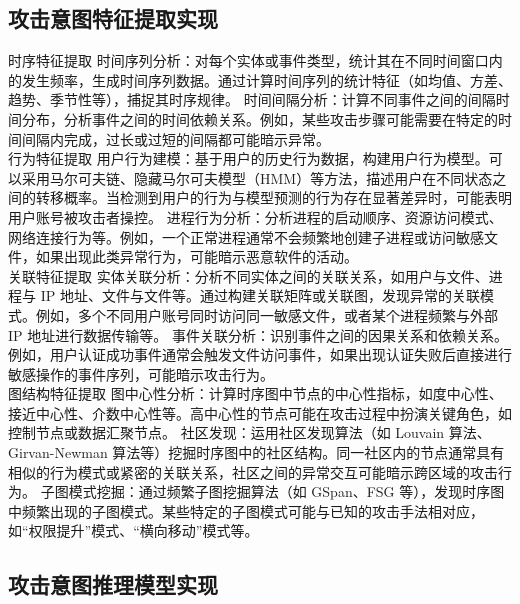 \documentclass{article} %
\begin{document}
	\subsection{攻击意图特征提取实现}

	时序特征提取
	时间序列分析：对每个实体或事件类型，统计其在不同时间窗口内的发生频率，生成时间序列数据。通过计算时间序列的统计特征（如均值、方差、趋势、季节性等），捕捉其时序规律。
	时间间隔分析：计算不同事件之间的间隔时间分布，分析事件之间的时间依赖关系。例如，某些攻击步骤可能需要在特定的时间间隔内完成，过长或过短的间隔都可能暗示异常。\\
	行为特征提取
	用户行为建模：基于用户的历史行为数据，构建用户行为模型。可以采用马尔可夫链、隐藏马尔可夫模型（HMM）等方法，描述用户在不同状态之间的转移概率。当检测到用户的行为与模型预测的行为存在显著差异时，可能表明用户账号被攻击者操控。
	进程行为分析：分析进程的启动顺序、资源访问模式、网络连接行为等。例如，一个正常进程通常不会频繁地创建子进程或访问敏感文件，如果出现此类异常行为，可能暗示恶意软件的活动。\\
	关联特征提取
	实体关联分析：分析不同实体之间的关联关系，如用户与文件、进程与 IP 地址、文件与文件等。通过构建关联矩阵或关联图，发现异常的关联模式。例如，多个不同用户账号同时访问同一敏感文件，或者某个进程频繁与外部 IP 地址进行数据传输等。
	事件关联分析：识别事件之间的因果关系和依赖关系。例如，用户认证成功事件通常会触发文件访问事件，如果出现认证失败后直接进行敏感操作的事件序列，可能暗示攻击行为。\\
	图结构特征提取
	图中心性分析：计算时序图中节点的中心性指标，如度中心性、接近中心性、介数中心性等。高中心性的节点可能在攻击过程中扮演关键角色，如控制节点或数据汇聚节点。
	社区发现：运用社区发现算法（如 Louvain 算法、Girvan-Newman 算法等）挖掘时序图中的社区结构。同一社区内的节点通常具有相似的行为模式或紧密的关联关系，社区之间的异常交互可能暗示跨区域的攻击行为。
	子图模式挖掘：通过频繁子图挖掘算法（如 GSpan、FSG 等），发现时序图中频繁出现的子图模式。某些特定的子图模式可能与已知的攻击手法相对应，如“权限提升”模式、“横向移动”模式等。
	
	\subsection{攻击意图推理模型实现}
	
\end{document}
